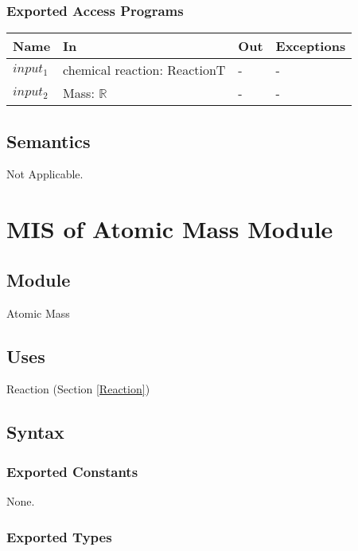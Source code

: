 \documentclass[12pt, titlepage]{article}
\begin{document}
\subsubsection{Exported Access Programs}

\begin{center}
\begin{tabular}{p{2cm} p{4cm} p{4cm} p{2cm}}
\hline
\textbf{Name} & \textbf{In} & \textbf{Out} & \textbf{Exceptions} \\
\hline
{$input_1$} & chemical reaction: \newline ReactionT & - & -   \\
{$input_2$} & Mass: $\mathbb{R}$ & - & -   \\
\hline
\end{tabular}
\end{center}

\subsection{Semantics}

Not Applicable.

\newpage

\section{MIS of Atomic Mass Module} \label{Atomic Mass} 

\subsection{Module}

Atomic Mass

\subsection{Uses}

Reaction (Section \ref{Reaction})

\subsection{Syntax}

\subsubsection{Exported Constants}

None.

\subsubsection{Exported Types}
\end{document}
